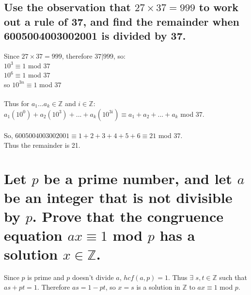 \documentclass[12pt]{article}
\begin{document}
\subsection{
    Use the observation that $27 \times 37 = 999$ to work out a rule of 37, and find the remainder when 6005004003002001 is divided by 37.
}
Since $27 \times 37 = 999$, therefore $37 | 999$, so:\\
$10^3 \equiv 1$ mod $37$\\
$10^6 \equiv 1$ mod $37$\\
so $10^{3n} \equiv 1$ mod $37$\\\\
Thus for $a_1 ... a_k \in \mathds{Z}$ and $i \in \mathds{Z}$:\\
$a_1(10^0) + a_2(10^3) + ... + a_k(10^{3i}) \equiv a_1 + a_2 + ... + a_k$ mod $37$.\\\\
So, $6005004003002001 \equiv 1+2+3+4+5+6 \equiv 21$ mod $37$.\\
Thus the remainder is 21.

\section{
    Let $p$ be a prime number, and let $a$ be an integer that is not divisible by $p$.
    Prove that the congruence equation $ax \equiv 1$ mod $p$ has a solution $x \in \mathds{Z}$.
}
Since $p$ is prime and $p$ doesn't divide $a$, $hcf(a,p) = 1$. Thus $\exists$ $s,t \in \mathds{Z}$ such that $as + pt = 1$.
Therefore $as = 1 - pt$, so $x=s$ is a solution in $\mathds{Z}$ to $ax \equiv 1$ mod $p$.
\end{document}
